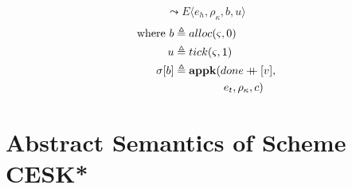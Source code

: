 \documentclass[12pt,draft]{article}
\newcommand\mdoubleplus{\ensuremath{\mathbin{+\mkern-9mu+}}}
\begin{document}
\begin{multicols*}{2}
\[\]
\vspace{-7mm}
\[
\leadsto
E\langle
e_h , \rho_{\kappa} , b , u
\rangle
\]
\vspace{-10mm}
\begin{align*}
\text{where } b &\triangleq alloc(\varsigma, 0) \\
u &\triangleq tick(\varsigma, 1) \\
\sigma[b] &\triangleq \textbf{appk}(done \mdoubleplus [v], \\
&\;\;\;\;\;\;\;\;\;\;\;\;\;\;\;\; e_t , \rho_{\kappa} , c)
\end{align*}
\end{multicols*}



\newpage
\section{Abstract Semantics of Scheme CESK*}
\end{document}
